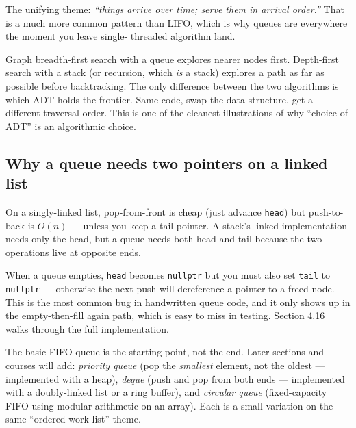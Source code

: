 \documentclass[11pt]{article}
\begin{document}
The unifying theme: \emph{``things arrive over time; serve them
in arrival order.''} That is a much more common pattern than LIFO,
which is why queues are everywhere the moment you leave single-
threaded algorithm land.

\begin{notebox}
Graph breadth-first search with a queue explores nearer nodes
first. Depth-first search with a stack (or recursion, which
\emph{is} a stack) explores a path as far as possible before
backtracking. The only difference between the two algorithms is
which ADT holds the frontier. Same code, swap the data structure,
get a different traversal order. This is one of the cleanest
illustrations of why ``choice of ADT'' is an algorithmic choice.
\end{notebox}

\subsection*{Why a queue needs two pointers on a linked list}

On a singly-linked list, pop-from-front is cheap (just advance
\texttt{head}) but push-to-back is $O(n)$ --- unless you keep a
tail pointer. A stack's linked implementation needs only the
head, but a queue needs both head and tail because the two
operations live at opposite ends.

\begin{warnbox}
When a queue empties, \texttt{head} becomes \texttt{nullptr} but
you must also set \texttt{tail} to \texttt{nullptr} --- otherwise
the next push will dereference a pointer to a freed node. This
is the most common bug in handwritten queue code, and it only
shows up in the empty-then-fill again path, which is easy to
miss in testing. Section 4.16 walks through the full
implementation.
\end{warnbox}

\begin{ideabox}
The basic FIFO queue is the starting point, not the end. Later
sections and courses will add: \emph{priority queue} (pop the
\emph{smallest} element, not the oldest --- implemented with a
heap), \emph{deque} (push and pop from both ends --- implemented
with a doubly-linked list or a ring buffer), and \emph{circular
queue} (fixed-capacity FIFO using modular arithmetic on an
array). Each is a small variation on the same ``ordered work
list'' theme.
\end{ideabox}
\end{document}
